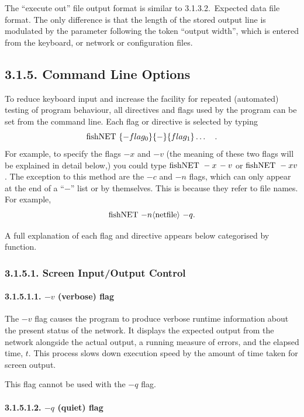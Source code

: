 \documentclass[12pt]{report}
\begin{document}
The ``execute out'' file output format is similar to 3.1.3.2.~Expected
data file format.
The only difference is that the length of the stored output line is
modulated by the parameter following the token ``output width'',
which is entered from the keyboard, or network or configuration
files.

\subsection{3.1.5. Command Line Options}

To reduce keyboard input and increase the facility for repeated
(automated) testing of program behaviour, all directives and flags
used by the program can be set from the command line.
Each flag or directive is selected by typing
$$
{\rm fishNET\ } \{-flag_0\}\{-\}\{flag_1\}\ldots\quad.
$$
For example, to specify the flags $-x$ and $-v$ (the meaning of
these two flags will be explained in detail below,) you could type
${\rm fishNET\ } -x {\rm \thinspace} -v$ or ${\rm fishNET\ } -xv$.
The exception to this method are the $-c$ and $-n$ flags, which can
only appear at the end of a ``$-$'' list or by themselves.
This is because they refer to file names.
For example,
$$
\text{fishNET\ $-n\langle{\rm netfile}\rangle$\ $-q$.}
$$

A full explanation of each flag and directive appears below
categorised by function.

\subsubsection{3.1.5.1. Screen Input/Output Control}

\paragraph{3.1.5.1.1. $-v$ (verbose) flag}

The $-v$ flag causes the program to produce verbose runtime
information about the present status of the network.
It displays the expected output from the network alongside the
actual output, a running measure of errors, and the elapsed time,
$t$.
This process slows down execution speed by the amount of time taken
for screen output.

This flag cannot be used with the $-q$ flag.

\paragraph{3.1.5.1.2. $-q$ (quiet) flag}
\end{document}
